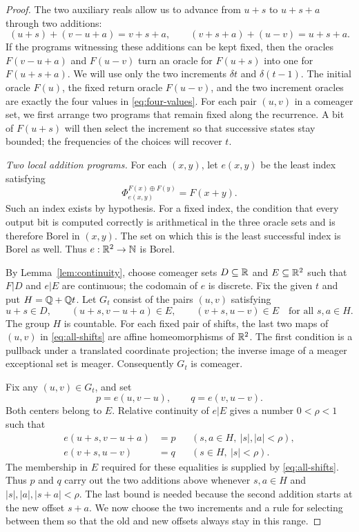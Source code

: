 \begin{proof}
The two auxiliary reals allow us to advance from $u+s$ to
$u+s+a$ through two additions:
\[
(u+s)+(v-u+a)=v+s+a,\qquad
(v+s+a)+(u-v)=u+s+a.
\]
If the programs witnessing these additions can be kept fixed,
then the oracles $F(v-u+a)$ and $F(u-v)$ turn an oracle for
$F(u+s)$ into one for $F(u+s+a)$. We will use only the two
increments $\delta t$ and $\delta(t-1)$. The initial oracle
$F(u)$, the fixed return oracle $F(u-v)$, and the two increment
oracles are exactly the four values in \eqref{eq:four-values}.
For each pair $(u,v)$ in a comeager set, we first arrange two
programs that remain fixed along the recurrence. A bit of
$F(u+s)$ will then select the increment so that successive
states stay bounded; the frequencies of the choices will
recover $t$.

\medskip
\noindent\emph{Two local addition programs.}
For each $(x,y)$, let $e(x,y)$ be the least index satisfying
\[
\Phi_{e(x,y)}^{F(x)\oplus F(y)}=F(x+y).
\]
Such an index exists by hypothesis. For a fixed index, the
condition that every output bit is computed correctly is
arithmetical in the three oracle sets and is therefore Borel
in $(x,y)$. The set on which this is the least successful
index is Borel as well. Thus $e:\mathbb R^2\to\mathbb N$ is Borel.

By Lemma~\ref{lem:continuity}, choose comeager sets
$D\subseteq\mathbb R$ and $E\subseteq\mathbb R^2$ such that $F|D$ and
$e|E$ are continuous; the codomain of $e$ is discrete.
Fix the given $t$ and put $H=\mathbb Q+\mathbb Q t$. Let $G_t$ consist
of the pairs $(u,v)$ satisfying
\begin{equation}\label{eq:all-shifts}
u+s\in D,\qquad
(u+s,v-u+a)\in E,\qquad
(v+s,u-v)\in E
\quad\text{for all }s,a\in H.
\end{equation}
The group $H$ is countable. For each fixed pair of shifts,
the last two maps of $(u,v)$ in \eqref{eq:all-shifts}
are affine homeomorphisms of $\mathbb R^2$. The first condition
is a pullback under a translated coordinate projection;
the inverse image of a meager exceptional set is meager.
Consequently $G_t$ is comeager.

Fix any $(u,v)\in G_t$, and set
\[
p=e(u,v-u),\qquad q=e(v,u-v).
\]
Both centers belong to $E$. Relative continuity of $e|E$
gives a number $0<\rho<1$ such that
\begin{align}
e(u+s,v-u+a)&=p
&& (s,a\in H,\ |s|,|a|<\rho),\label{eq:p}\\
e(v+s,u-v)&=q
&& (s\in H,\ |s|<\rho).\label{eq:q}
\end{align}
The membership in $E$ required for these equalities is
supplied by \eqref{eq:all-shifts}. Thus $p$ and $q$ carry out
the two additions above whenever $s,a\in H$ and
$|s|,|a|,|s+a|<\rho$. The last bound is needed because the
second addition starts at the new offset $s+a$. We now choose
the two increments and a rule for selecting between them so
that the old and new offsets always stay in this range.


\end{proof}
